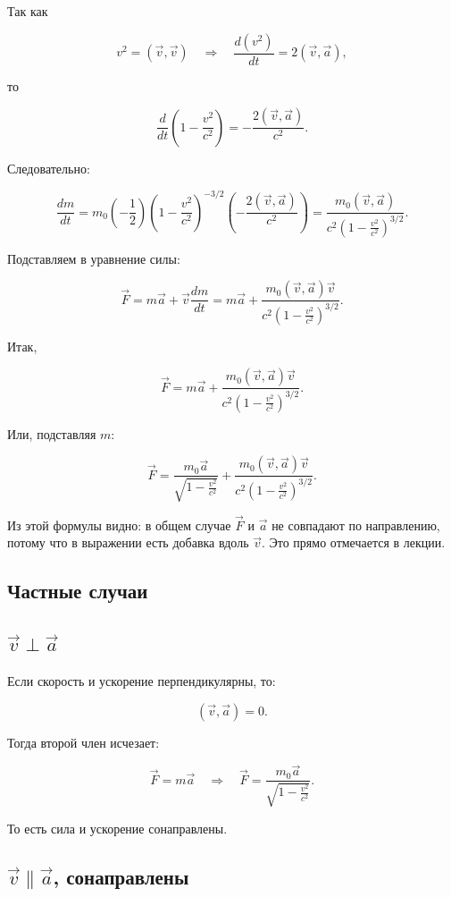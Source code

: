\documentclass[a4paper,12pt]{article}
\begin{document}
Так как

\[
v^2=(\vec v,\vec v)
\quad \Rightarrow \quad
\frac{d(v^2)}{dt}=2(\vec v,\vec a),
\]

то

\[
\frac{d}{dt}
\left(1-\frac{v^2}{c^2}\right)
=
-\frac{2(\vec v,\vec a)}{c^2}.
\]

Следовательно:

\[
\frac{dm}{dt}
=
m_0\left(-\frac{1}{2}\right)
\left(1-\frac{v^2}{c^2}\right)^{-3/2}
\left(-\frac{2(\vec v,\vec a)}{c^2}\right)
=
\frac{m_0(\vec v,\vec a)}
{c^2\left(1-\frac{v^2}{c^2}\right)^{3/2}}.
\]

Подставляем в уравнение силы:

\[
\vec F
=
m\vec a
+
\vec v\frac{dm}{dt}
=
m\vec a
+
\frac{m_0(\vec v,\vec a)\vec v}
{c^2\left(1-\frac{v^2}{c^2}\right)^{3/2}}.
\]

Итак,

\[
\vec F
=
m\vec a
+
\frac{m_0(\vec v,\vec a)\vec v}
{c^2\left(1-\frac{v^2}{c^2}\right)^{3/2}}.
\]

Или, подставляя $m$:

\[
\vec F
=
\frac{m_0\vec a}{\sqrt{1-\frac{v^2}{c^2}}}
+
\frac{m_0(\vec v,\vec a)\vec v}
{c^2\left(1-\frac{v^2}{c^2}\right)^{3/2}}.
\]

Из этой формулы видно: в общем случае $\vec F$ и $\vec a$ не совпадают по направлению, потому что в выражении есть добавка вдоль $\vec v$. Это прямо отмечается в лекции.

\subsection*{Частные случаи}

\subsection*{$\vec v \perp \vec a$}

Если скорость и ускорение перпендикулярны, то:

\[
(\vec v,\vec a)=0.
\]

Тогда второй член исчезает:

\[
\vec F = m\vec a
\quad \Rightarrow \quad
\vec F =
\frac{m_0\vec a}{\sqrt{1-\frac{v^2}{c^2}}}.
\]

То есть сила и ускорение сонаправлены.

\subsection*{$\vec v \parallel \vec a$, сонаправлены}
\end{document}
